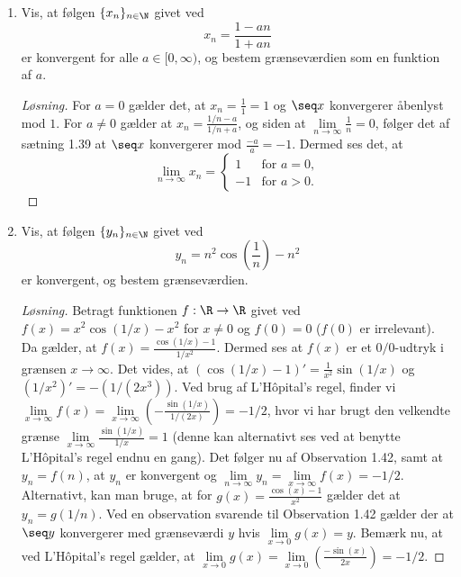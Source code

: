 \begin{opg}\hfill
	\begin{enumerate}
		\item Vis, at f\o{}lgen $\{x_n\}_{n\in\N}$ givet ved
		\[
		x_n=\frac{1-an}{1+an}
		\]	
		er konvergent for alle $a\in [0,\infty)$, og bestem gr\ae{}nsev\ae{}rdien som en funktion af $a$.
		
		\ifanswers \begin{proof}[Løsning]
			For $ a=0 $ gælder det, at $ x_n=\frac{1}{1}=1 $ og $ \seq x $ konvergerer åbenlyst mod $ 1 $. For $ a\neq 0 $ gælder at $ x_n=\frac{1/n-a}{1/n+a} $, og siden at $ \lim\limits_{n\to\infty}\frac{1}{n}=0 $, følger det af sætning 1.39 at $ \seq x $ konvergerer mod $ \frac{-a}{a}=-1 $. Dermed ses det, at \begin{equation}
			\lim\limits_{n\to\infty}x_n=\begin{cases}
			1& \text{for }a=0,\\
			-1&\text{for }a>0.
			\end{cases}
			\end{equation}
		\end{proof} \fi
		
		
		\item Vis, at f\o{}lgen $\{y_n\}_{n\in\N}$ givet ved
		\[
		y_n=n^2\cos\left(\frac1n\right)-n^2
		\]	
		er konvergent, og bestem gr\ae{}nsev\ae{}rdien.
		
		\ifanswers \begin{proof}[Løsning]
			Betragt funktionen $ f:\R\to\R  $ givet ved $ f(x)=x^2\cos(1/x)-x^2 $ for $ x\neq 0 $ og $ f(0)=0 $ ($ f(0) $ er irrelevant). Da gælder, at $ f(x)=\frac{\cos(1/x)-1}{1/x^2} $. Dermed ses at $ f(x) $ er et $ 0/0 $-udtryk i grænsen $ x\to\infty $. Det vides, at $ (\cos(1/x)-1)'=\frac{1}{x^2}\sin(1/x) $ og $ (1/x^2)'=-(1/(2x^3)) $. Ved brug af L'H\^opital's regel, finder vi $ \lim\limits_{x\to\infty}f(x)=\lim\limits_{x\to\infty}\left(-\frac{\sin(1/x)}{1/(2x)}\right)=-1/2 $, hvor vi har brugt den velkendte grænse $ \lim\limits_{x\to\infty}\frac{\sin(1/x)}{1/x}=1 $ (denne kan alternativt ses ved at benytte L'H\^opital's regel endnu en gang). Det følger nu af Observation 1.42, samt at $ y_n=f(n) $, at $ y_n $ er konvergent og $ \lim\limits_{n\to\infty}y_n=\lim\limits_{x\to\infty}f(x)=-1/2 $.\\
			Alternativt, kan man bruge, at for $ g(x)=\frac{\cos(x)-1}{x^2}$ gælder det at $ y_n=g(1/n) $. Ved en observation svarende til Observation 1.42 gælder der at $ \seq y $ konvergerer med grænseværdi $ y $ hvis $ \lim\limits_{x\to0}g(x)=y $. Bemærk nu, at ved L'H\^opital's regel gælder, at $ \lim\limits_{x\to 0}g(x)=\lim\limits_{x\to0}\left(\frac{-\sin(x)}{2x}\right)=-1/2 $.
		\end{proof} \fi
		

\end{enumerate}
\end{opg}
